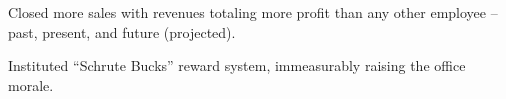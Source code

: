 \begin{achievements}
	\item Closed more sales with revenues totaling more profit than any other employee – past, present, and future (projected).
	\item Instituted ``Schrute Bucks'' reward system, immeasurably raising the office morale.
\end{achievements}
